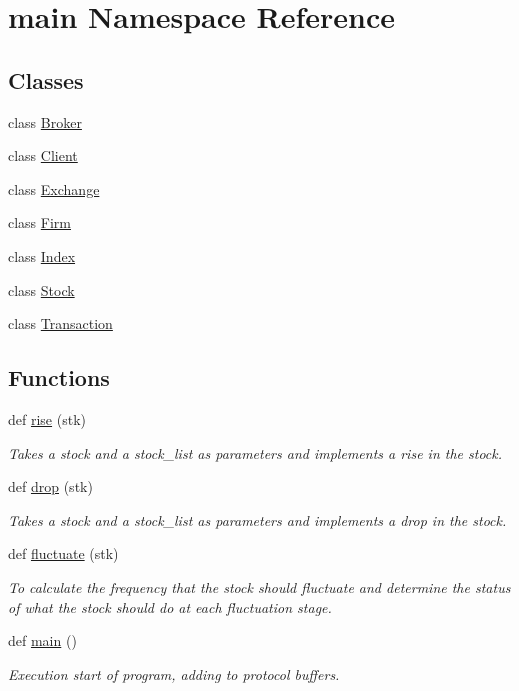 \hypertarget{namespacemain}{}\section{main Namespace Reference}
\label{namespacemain}
\subsection*{Classes}
\begin{DoxyCompactItemize}
\item 
class \hyperlink{classmain_1_1_broker}{Broker}
\item 
class \hyperlink{classmain_1_1_client}{Client}
\item 
class \hyperlink{classmain_1_1_exchange}{Exchange}
\item 
class \hyperlink{classmain_1_1_firm}{Firm}
\item 
class \hyperlink{classmain_1_1_index}{Index}
\item 
class \hyperlink{classmain_1_1_stock}{Stock}
\item 
class \hyperlink{classmain_1_1_transaction}{Transaction}
\end{DoxyCompactItemize}
\subsection*{Functions}
\begin{DoxyCompactItemize}
\item 
def \hyperlink{namespacemain_a5aa5d0ac88f55ae53d76b293141066dc}{rise} (stk)
\begin{DoxyCompactList}\small\item\em Takes a stock and a stock\+\_\+list as parameters and implements a rise in the stock. \end{DoxyCompactList}\item 
def \hyperlink{namespacemain_a4f0f57999b86fd72af7f37765824205c}{drop} (stk)
\begin{DoxyCompactList}\small\item\em Takes a stock and a stock\+\_\+list as parameters and implements a drop in the stock. \end{DoxyCompactList}\item 
def \hyperlink{namespacemain_a1f400f1c224487acb7bf254352f8ee88}{fluctuate} (stk)
\begin{DoxyCompactList}\small\item\em To calculate the frequency that the stock should fluctuate and determine the status of what the stock should do at each fluctuation stage. \end{DoxyCompactList}\item 
def \hyperlink{namespacemain_af613cea4cba4fb7de8e40896b3368945}{main} ()
\begin{DoxyCompactList}\small\item\em Execution start of program, adding to protocol buffers. \end{DoxyCompactList}\end{DoxyCompactItemize}


